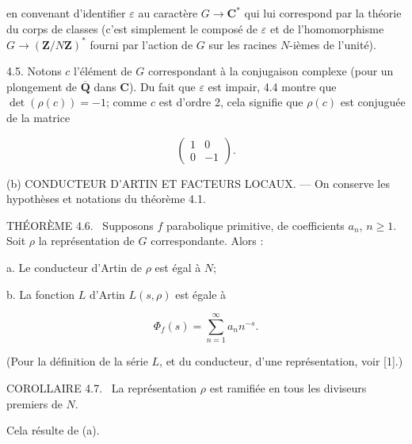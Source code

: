\documentclass[10pt,oneside]{article}
\begin{document}
en convenant d'identifier \(\varepsilon\) au caractère \(G\longrightarrow\mathbf{C}^*\) qui lui correspond par la théorie du corps de classes (c'est simplement le composé de \(\varepsilon\) et de l'homomorphisme \(G\longrightarrow(\mathbf{Z}/N\mathbf{Z})^*\) fourni par l'action de \(G\) sur les racines \(N\)-ièmes de l'unité).\par

4.5. Notons \(c\) l'élément de \(G\) correspondant à la conjugaison complexe (pour un plongement de \(\overline{\mathbf{Q}}\) dans \(\mathbf{C}\)). Du fait que \(\varepsilon\) est impair, 4.4 montre que \(\det(\rho(c))=-1\); comme \(c\) est d'ordre 2, cela signifie que \(\rho(c)\) est conjuguée de la matrice\par

\begin{equation*}
\begin{pmatrix}1&0\\0&-1\end{pmatrix}.
\end{equation*}

(b) CONDUCTEUR D'ARTIN ET FACTEURS LOCAUX. — On conserve les hypothèses et notations du théorème 4.1.\par

\noindent\textsc{THÉORÈME 4.6.} \textemdash\ Supposons \(f\) parabolique primitive, de coefficients \(a_n\), \(n\geq 1\). Soit \(\rho\) la représentation de \(G\) correspondante. Alors :\par

a. Le conducteur d'Artin de \(\rho\) est égal à \(N\);\par

b. La fonction \(L\) d'Artin \(L(s,\rho)\) est égale à\par

\begin{equation*}
\Phi_f(s)=\sum_{n=1}^{\infty}a_nn^{-s}.
\end{equation*}

(Pour la définition de la série \(L\), et du conducteur, d'une représentation, voir [1].)\par

\noindent\textsc{COROLLAIRE 4.7.} \textemdash\ La représentation \(\rho\) est ramifiée en tous les diviseurs premiers de \(N\).\par

Cela résulte de (a).\par

\newpage
\end{document}
